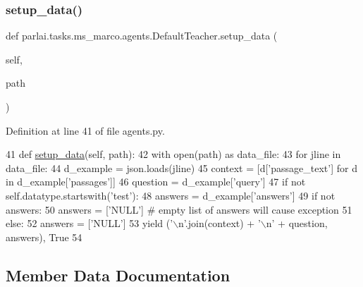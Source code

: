 \subsubsection{\texorpdfstring{setup\+\_\+data()}{setup\_data()}}
{\footnotesize\ttfamily def parlai.\+tasks.\+ms\+\_\+marco.\+agents.\+Default\+Teacher.\+setup\+\_\+data (\begin{DoxyParamCaption}\item[{}]{self,  }\item[{}]{path }\end{DoxyParamCaption})}



Definition at line 41 of file agents.\+py.


\begin{DoxyCode}
41     \textcolor{keyword}{def }\hyperlink{namespaceparlai_1_1tasks_1_1multinli_1_1agents_a4fa2cb0ba1ed745336ad8bceed36b841}{setup\_data}(self, path):
42         with open(path) \textcolor{keyword}{as} data\_file:
43             \textcolor{keywordflow}{for} jline \textcolor{keywordflow}{in} data\_file:
44                 d\_example = json.loads(jline)
45                 context = [d[\textcolor{stringliteral}{'passage\_text'}] \textcolor{keywordflow}{for} d \textcolor{keywordflow}{in} d\_example[\textcolor{stringliteral}{'passages'}]]
46                 question = d\_example[\textcolor{stringliteral}{'query'}]
47                 \textcolor{keywordflow}{if} \textcolor{keywordflow}{not} self.datatype.startswith(\textcolor{stringliteral}{'test'}):
48                     answers = d\_example[\textcolor{stringliteral}{'answers'}]
49                     \textcolor{keywordflow}{if} \textcolor{keywordflow}{not} answers:
50                         answers = [\textcolor{stringliteral}{'NULL'}]  \textcolor{comment}{# empty list of answers will cause exception}
51                 \textcolor{keywordflow}{else}:
52                     answers = [\textcolor{stringliteral}{'NULL'}]
53                 \textcolor{keywordflow}{yield} (\textcolor{stringliteral}{'\(\backslash\)n'}.join(context) + \textcolor{stringliteral}{'\(\backslash\)n'} + question, answers), \textcolor{keyword}{True}
54 \end{DoxyCode}


\subsection{Member Data Documentation}
\mbox{\label{classparlai_1_1tasks_1_1ms__marco_1_1agents_1_1DefaultTeacher_abcedf76bc126510edfe336ab60b76a58}} 
